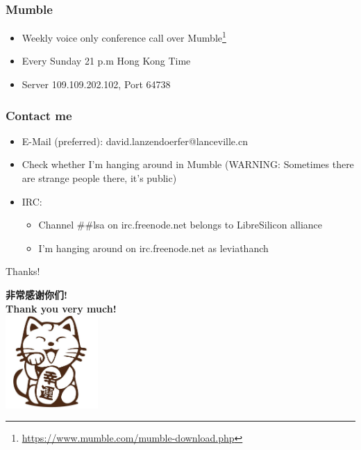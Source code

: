 \documentclass{beamer}
\begin{document}
\begin{frame}
	\frametitle{Mumble}
	\begin{itemize}
		\item Weekly voice only conference call over Mumble\footnote{\url{https://www.mumble.com/mumble-download.php}}
		\item Every Sunday 21 p.m Hong Kong Time
		\item Server 109.109.202.102, Port 64738
	\end{itemize}
\end{frame}


\begin{frame}
	\frametitle{Contact me}
	\begin{itemize}
		\item E-Mail (preferred): david.lanzendoerfer@lanceville.cn
		\item Check whether I'm hanging around in Mumble (WARNING: Sometimes there are strange people there, it's public)
		\item IRC: \begin{itemize}
			\item Channel \#\#lsa on irc.freenode.net belongs to LibreSilicon alliance
			\item I'm hanging around on irc.freenode.net as leviathanch
		\end{itemize}
	\end{itemize}
\end{frame}


\begin{frame}{Thanks!}
	\begin{center}
		\textbf{非常感谢你们!} \\
		\textbf{Thank you very much!} \\
		\includegraphics[width=100pt]{cat.png}
	\end{center}
\end{frame}

\end{document}
